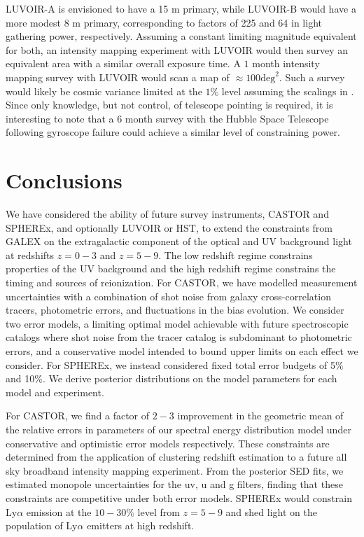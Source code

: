 \documentclass[fleqn,usenatbib]{mnras}
\begin{document}
{\small LUVOIR}-A is envisioned to have a 15 m primary, while {\small LUVOIR}-B would have a more modest 8 m primary, corresponding to factors of 225 and 64 in light gathering power, respectively. Assuming a constant limiting magnitude equivalent for both, an intensity mapping experiment with {\small LUVOIR} would then survey an equivalent area with a similar overall exposure time. A $1$ month intensity mapping survey with {\small LUVOIR} would scan a map of $\approx 100 \mathrm{deg}^2$. Such a survey would likely be cosmic variance limited at the $1\%$ level assuming the scalings in \citep{Moster_2011}. Since only knowledge, but not control, of telescope pointing is required, it is interesting to note that a 6 month survey with the Hubble Space Telescope following gyroscope failure could achieve a similar level of constraining power.


\section{Conclusions} 
\label{sec:conclusions}

We have considered the ability of future survey instruments, {\small CASTOR} and {\small SPHEREx}, and optionally {\small LUVOIR} or HST, to extend the constraints from {\small GALEX} on the extragalactic component of the optical and UV background light at redshifts $z=0-3$ and $z=5-9$. The low redshift regime constrains properties of the UV background and the high redshift regime constrains the timing and sources of reionization. For {\small CASTOR}, we have modelled measurement uncertainties with a combination of shot noise from galaxy cross-correlation tracers, photometric errors, and fluctuations in the bias evolution. We consider two error models, a limiting optimal model achievable with future spectroscopic catalogs where shot noise from the tracer catalog is subdominant to photometric errors, and a conservative model intended to bound upper limits on each effect we consider. For {\small SPHEREx}, we instead considered fixed total error budgets of 5$\%$ and 10$\%$. We derive posterior distributions on the model parameters for each model and experiment. 


For {\small CASTOR}, we find a factor of $2-3$ improvement in the geometric mean of the relative errors in parameters of our spectral energy distribution model under conservative and optimistic error models respectively. These constraints are determined from the application of clustering redshift estimation to a future all sky broadband intensity mapping experiment. From the posterior SED fits, we estimated monopole uncertainties for the uv, u and g filters, finding that these constraints are competitive under both error models. {\small SPHEREx} would constrain Ly$\alpha$ emission at the $10-30\%$ level from $z=5-9$ and shed light on the population of Ly$\alpha$ emitters at high redshift.
\end{document}
